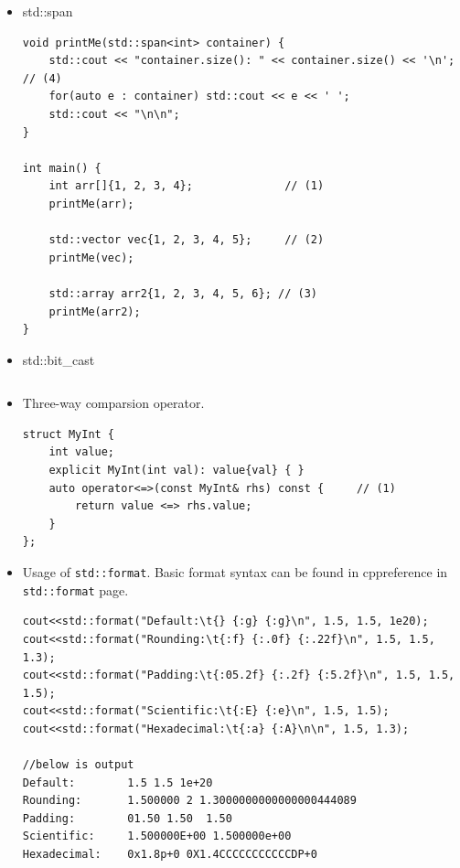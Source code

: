 \documentclass[a4paper,11pt,twoside]{book}
\begin{document}
\begin{itemize}
	\item std::span
\begin{lstlisting}
void printMe(std::span<int> container) {	
	std::cout << "container.size(): " << container.size() << '\n';  // (4)
	for(auto e : container) std::cout << e << ' ';
	std::cout << "\n\n";
}

int main() {
	int arr[]{1, 2, 3, 4};              // (1)
	printMe(arr);
	
	std::vector vec{1, 2, 3, 4, 5};     // (2)
	printMe(vec);
	
	std::array arr2{1, 2, 3, 4, 5, 6}; // (3)
	printMe(arr2);
}
\end{lstlisting}
	
	\item std::bit\_cast
\begin{lstlisting}

\end{lstlisting}
	
	\item Three-way comparsion operator.
\begin{lstlisting}
struct MyInt {
    int value;
    explicit MyInt(int val): value{val} { }
    auto operator<=>(const MyInt& rhs) const {     // (1)      
        return value <=> rhs.value;
    }
};
\end{lstlisting}	
    \item Usage of \texttt{std::format}. Basic format syntax can be found in cppreference in \texttt{std::format} page.
\begin{lstlisting}[]
cout<<std::format("Default:\t{} {:g} {:g}\n", 1.5, 1.5, 1e20);
cout<<std::format("Rounding:\t{:f} {:.0f} {:.22f}\n", 1.5, 1.5, 1.3);
cout<<std::format("Padding:\t{:05.2f} {:.2f} {:5.2f}\n", 1.5, 1.5, 1.5);
cout<<std::format("Scientific:\t{:E} {:e}\n", 1.5, 1.5);
cout<<std::format("Hexadecimal:\t{:a} {:A}\n\n", 1.5, 1.3);

//below is output
Default:        1.5 1.5 1e+20
Rounding:       1.500000 2 1.3000000000000000444089
Padding:        01.50 1.50  1.50
Scientific:     1.500000E+00 1.500000e+00
Hexadecimal:    0x1.8p+0 0X1.4CCCCCCCCCCCDP+0
\end{lstlisting}

\end{itemize}
\end{document}
